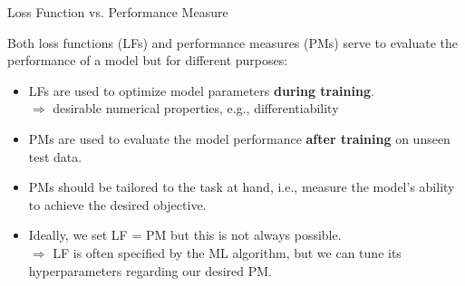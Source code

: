 \documentclass[11pt,compress,t,notes=noshow, aspectratio=169, xcolor=table]{beamer}
\begin{document}
\begin{frame}{Loss Function vs. Performance Measure}

Both loss functions (LFs) and performance measures (PMs) serve to evaluate the performance of a model but for different purposes:

\begin{itemize}
    \item LFs are used to optimize model parameters \textbf{during training}. \\
    $\Rightarrow$ desirable numerical properties, e.g., differentiability
    \item PMs are used to evaluate the model performance \textbf{after training} on unseen test data. 
    \item PMs should be tailored to the task at hand, i.e., measure the model's ability to achieve the desired objective.
    \item Ideally, we set LF = PM but this is not always possible.\\
    $\Rightarrow$ LF is often specified by the ML algorithm, but we can tune its hyperparameters regarding our desired PM.
\end{itemize}
\end{frame}
\end{document}
